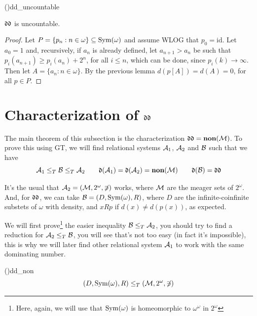 \begin{theorem}{(\cite{brech})}{dd_uncountable}
    \begin{center}
        $\mathfrak{dd}$ is uncountable.
    \end{center}
\end{theorem}

\begin{proof}
    Let $P=\{p_n:n\in\omega\}\subseteq\mathrm{Sym}(\omega)$ and assume WLOG that $p_0=\mathrm{id}$. Let $a_0=1$ and, recursively, if $a_n$ is already defined, let $a_{n+1}>a_n$ be such that $p_i(a_{n+1})\geq p_i(a_n)+2^n$, for all $i\leq n$, which can be done, since $p_i(k)\to\infty$. Then let $A=\{a_n:n\in\omega\}$. By the previous lemma $d(p[A])=d(A)=0$, for all $p\in P$.
\end{proof}

\section{Characterization of \texorpdfstring{$\mathfrak{dd}$}{dd}}

The main theorem of this subsection is the characterization $\mathfrak{dd}=\textbf{non}(\mathcal{M})$. To prove this using GT, we will find relational systems $\mathcal{A}_1$, $\mathcal{A}_2$ and $\mathcal{B}$ such that we have
$$\mathcal{A}_1\leq_T\mathcal{B}\leq_T\mathcal{A}_2\qquad\mathfrak{d}(\mathcal{A}_1)=\mathfrak{d}(\mathcal{A}_2)=\textbf{non}(\mathcal{M})\qquad\mathfrak{d}(\mathcal{B})=\mathfrak{dd}$$

It's the usual that $\mathcal{A}_2=(\mathcal{M},2^\omega,\not\ni)$ works, where $\mathcal{M}$ are the meager sets of $2^\omega$. And, for $\mathfrak{dd}$, we can take $\mathcal{B}=(D,\mathrm{Sym}(\omega),R)$, where $D$ are the infinite-coinfinite substets of $\omega$ with density, and $xRp$ if $d(x)\neq d(p(x))$, as expected.

We will first prove\footnote{Here, again, we will use that $\mathrm{Sym}(\omega)$ is homeomorphic to $\omega^\omega$ in $2^\omega$} the easier inequality $\mathcal{B}\leq_T\mathcal{A}_2$, you should try to find a reduction for $\mathcal{A}_2\leq_T\mathcal{B}$, you will see that's not too easy (in fact it's impossible), this is why we will later find other relational system $\mathcal{A}_1$ to work with the same dominating number.

\begin{lemma}{(\cite{brech})}{dd_non}
    $$(D,\mathrm{Sym}(\omega),R)\leq_T(\mathcal{M},2^\omega,\not\ni)$$
\end{lemma}

